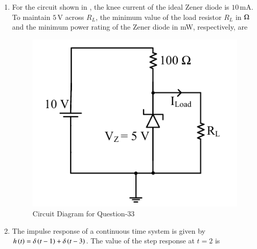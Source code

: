 \documentclass[journal,12pt,onecolumn]{IEEEtran}
\theoremstyle{remark}
\begin{document}
\begin{enumerate}
\item For the circuit shown in , the knee current of the ideal Zener diode is $10\,\text{mA}$. To maintain $5\,\text{V}$ across $R_L$, the minimum value of the load resistor $R_L$ in $\ohm$ and the minimum power rating of the Zener diode in mW, respectively, are  
\par \hfill{}
\begin{figure}[H]
\centering
\includegraphics[width=0.3\columnwidth]{Figs/Q-33.png}
\caption{Circuit Diagram for Question-33}
\label{33}
\end{figure}
\begin{enumerate}
\end{enumerate}

\item The impulse response of a continuous time system is given by $h\left(t\right) = \delta\left(t-1\right) + \delta\left(t-3\right)$. The value of the step response at $t = 2$ is  
\par \hfill{}
\begin{enumerate}
\end{enumerate}


\end{enumerate}
\end{document}

